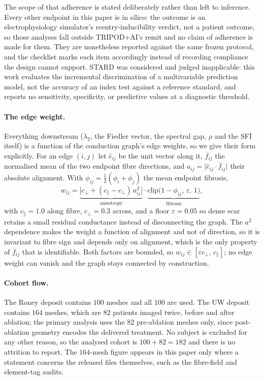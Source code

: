 \documentclass[11pt]{article}
\theoremstyle{definition}
\newcommand{\lam}{\lambda}
\newcommand{\rhoval}{\rho}
\begin{document}
The scope of that adherence is stated deliberately rather than left to
inference. Every other endpoint in this paper is in silico: the outcome is an
electrophysiology simulator's reentry-inducibility verdict, not a patient
outcome, so those analyses fall outside TRIPOD+AI's remit and no claim of
adherence is made for them. They are nonetheless reported against the same
frozen protocol, and the checklist marks each item accordingly instead of
recording compliance the design cannot support. STARD was considered and judged
inapplicable: this work evaluates the incremental discrimination of a
multivariable prediction model, not the accuracy of an index test against a
reference standard, and reports no sensitivity, specificity, or predictive
values at a diagnostic threshold.

\paragraph{The edge weight.} Everything downstream ($\lam_2$, the Fiedler
vector, the spectral gap, $\rhoval$ and the SFI itself) is a function of the
conduction graph's edge weights, so we give their form explicitly. For an edge
$(i,j)$ let $\hat{e}_{ij}$ be the unit vector along it, $\bar{f}_{ij}$ the
normalised mean of the two endpoint fibre directions, and
$a_{ij}=\lvert\hat{e}_{ij}\cdot\bar{f}_{ij}\rvert$ their absolute alignment. With
$\phi_{ij}=\tfrac12(\phi_i+\phi_j)$ the mean endpoint fibrosis,
\begin{equation}
w_{ij}=\underbrace{\bigl[c_\perp+(c_\parallel-c_\perp)\,a_{ij}^{2}\bigr]}_{\text{anisotropy}}
\cdot\underbrace{\mathrm{clip}\bigl(1-\phi_{ij},\,\varepsilon,\,1\bigr)}_{\text{fibrosis}},
\label{eq:weight}
\end{equation}
with $c_\parallel=1.0$ along fibre, $c_\perp=0.3$ across, and a floor
$\varepsilon=0.05$ so dense scar retains a small residual conductance instead of
disconnecting the graph. The $a^{2}$ dependence makes the weight a function of
alignment and not of direction, so it is invariant to fibre sign and depends only on alignment, which is the
only property of $\bar{f}_{ij}$ that is identifiable. Both factors are bounded, so
$w_{ij}\in[\varepsilon c_\perp,\,c_\parallel]$; no edge weight can vanish and the
graph stays connected by construction.

\paragraph{Cohort flow.} The Roney deposit contains $100$ meshes and all $100$
are used. The UW deposit contains $164$ meshes, which are $82$ patients imaged
twice, before and after ablation; the primary analysis uses the $82$
pre-ablation meshes only, since post-ablation geometry encodes the
delivered treatment. No subject is excluded for any other reason, so the analysed
cohort is $100+82=182$ and there is no attrition to report. The $164$-mesh figure
appears in this paper only where a statement concerns the released files
themselves, such as the fibre-field and element-tag audits.
\end{document}
